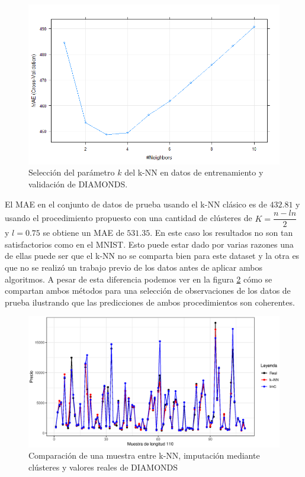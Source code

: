 \documentclass[12pt]{report} %
\theoremstyle{definition}
\begin{document}
\begin{figure}[H]
	\centering
	\includegraphics[scale=0.7]{imagenes/knn2.png}
	\caption{Selección del parámetro $k$ del k-NN en datos de entrenamiento y validación de DIAMONDS.}
	\label{fig:modelo2}
\end{figure}

El MAE en el conjunto de datos de prueba usando el k-NN clásico es de $432.81$ y usando el procedimiento propuesto con una cantidad de clústeres de $K = \dfrac{n-ln}{2}$ y $l = 0.75$ se obtiene un MAE de $531.35$. En este caso los resultados no son tan satisfactorios como en el MNIST. Esto puede estar dado por varias razones una de ellas puede ser que el k-NN no se comparta bien para este dataset y la otra es que no se realizó un trabajo previo de los datos antes de aplicar ambos algoritmos. A pesar de esta diferencia podemos ver en la figura \ref{fig:final2} cómo se compartan ambos métodos para una selección de observaciones de los datos de prueba ilustrando que las predicciones de ambos procedimientos son coherentes. 

\begin{figure}[H]
	\centering
	\includegraphics[scale=0.6]{imagenes/finaldiamonds.eps}
	\caption{Comparación de una muestra entre k-NN, imputación mediante clústeres y valores reales de DIAMONDS}
	\label{fig:final2}
\end{figure}
\end{document}
